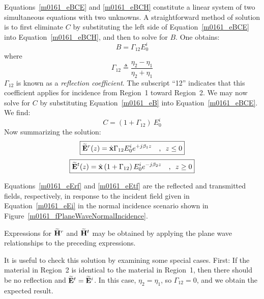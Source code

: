 Equations~\ref{m0161_eBCE} and \ref{m0161_eBCH} constitute a linear system of two simultaneous equations with two unknowns.  
A straightforward method of solution is to first eliminate $C$ by substituting the left side of Equation~\ref{m0161_eBCE} into Equation~\ref{m0161_eBCH}, and then to solve for $B$.   One obtains:
%
\begin{equation}
B = \Gamma_{12} E_0^i
\label{m0161_eB}
\end{equation}
%
where
%
\begin{equation}
\boxed{
\Gamma_{12}  \triangleq \frac{\eta_2-\eta_1}{\eta_2+\eta_1} 
}
\label{m0161_eG}
\end{equation}
%
$\Gamma_{12}$ is known as a {\it reflection coefficient}.  
The subscript ``12'' indicates that this coefficient applies for incidence from Region~1 toward Region~2. 
We may now solve for $C$ by substituting Equation~\ref{m0161_eB} into Equation~\ref{m0161_eBCE}.  We find:
%
\begin{equation}
C = (1+\Gamma_{12})~E_0^i
\end{equation}
%
Now summarizing the solution:
%
\begin{equation}
\boxed{ \widetilde{\bf E}^r(z) = \hat{\bf x} \Gamma_{12} E_0^i e^{+j\beta_1 z} ~~~\mbox{,}~~z \le 0 } 
\label{m0161_eErf}
\end{equation}
%
\begin{equation}
\boxed{ \widetilde{\bf E}^t(z) = \hat{\bf x} \left( 1+\Gamma_{12} \right) E_0^i e^{-j\beta_2 z} ~~~\mbox{,}~~z \ge 0 }
\label{m0161_eEtf}
\end{equation}
%
\begin{mdframed}[backgroundcolor=yellow!20,nobreak=true] 
Equations~\ref{m0161_eErf} and \ref{m0161_eEtf} are the reflected and transmitted fields, respectively, in response to the incident field given in Equation~\ref{m0161_eEi} in the normal incidence scenario shown in Figure~\ref{m0161_fPlaneWaveNormalIncidence}.
\end{mdframed}
%
Expressions for $\widetilde{\bf H}^r$ and $\widetilde{\bf H}^t$ may be obtained by applying the plane wave relationships to the preceding expressions.

It is useful to check this solution by examining some special cases.
First: If the material in Region~2 is identical to the material in Region~1, then there should be no reflection and $\widetilde{\bf E}^t=\widetilde{\bf E}^i$.
In this case, $\eta_2=\eta_1$, so $\Gamma_{12}=0$, and we obtain the expected result.

